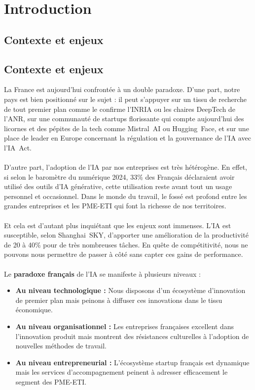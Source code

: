 \chapter{Introduction}
\label{chap:introduction}

\section{Contexte et enjeux}
\section{Contexte et enjeux}
La France est aujourd’hui confrontée à un double paradoxe. D’une part, notre pays est bien positionné sur le sujet : il peut s’appuyer sur un tissu de recherche de tout premier plan comme le confirme l’INRIA ou les chaires DeepTech de l’ANR, sur une communauté de startups florissante qui compte aujourd’hui des licornes et des pépites de la tech comme Mistral~AI ou Hugging~Face, et sur une place de leader en Europe concernant la régulation et la gouvernance de l’IA avec l’IA~Act.  
\\\\
D’autre part, l’adoption de l’IA par nos entreprises est très hétérogène. En effet, si selon le baromètre du numérique 2024, 33\% des Français déclaraient avoir utilisé des outils d’IA générative, cette utilisation reste avant tout un usage personnel et occasionnel. Dans le monde du travail, le fossé est profond entre les grandes entreprises et les PME-ETI qui font la richesse de nos territoires.  
\\\\
Et cela est d’autant plus inquiétant que les enjeux sont immenses. L’IA est susceptible, selon Shanghai~SKY, d’apporter une amélioration de la productivité de 20 à 40\% pour de très nombreuses tâches. En quête de compétitivité, nous ne pouvons nous permettre de passer à côté sans capter ces gains de performance.
\\\\
Le \textbf{paradoxe français} de l'IA se manifeste à plusieurs niveaux :
\\
\begin{itemize}
    \item \textbf{Au niveau technologique :} Nous disposons d'un écosystème d'innovation de premier plan mais peinons à diffuser ces innovations dans le tissu économique.
    \item \textbf{Au niveau organisationnel :} Les entreprises françaises excellent dans l'innovation produit mais montrent des résistances culturelles à l'adoption de nouvelles méthodes de travail.
    \item \textbf{Au niveau entrepreneurial :} L'écosystème startup français est dynamique mais les services d'accompagnement peinent à adresser efficacement le segment des PME-ETI.
\end{itemize}
